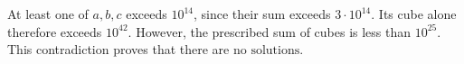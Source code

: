 At least one of $a,b,c$ exceeds $10^{14}$, since their sum exceeds $3\cdot10^{14}$. Its cube alone therefore exceeds $10^{42}$. However, the prescribed sum of cubes is less than $10^{25}$. This contradiction proves that there are $\boxed{\text{no solutions}}$.
